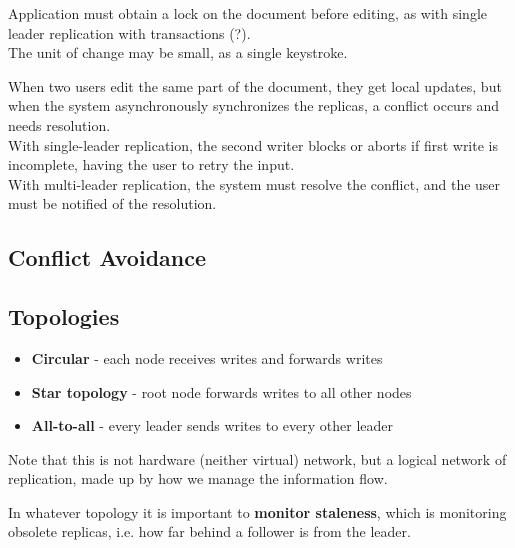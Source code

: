 Application must obtain a lock on the document before editing, as with single leader replication with transactions (?).\\
The unit of change may be small, as a single keystroke.\nl

When two users edit the same part of the document, they get local updates, but when the system asynchronously synchronizes the replicas, a conflict occurs and needs resolution.\\
With single-leader replication, the second writer blocks or aborts if first write is incomplete, having the user to retry the input.\\
With multi-leader replication, the system must resolve the conflict, and the user must be notified of the resolution.

\subsection{Conflict Avoidance}



\subsection{Topologies}
\begin{itemize}
   \item \textbf{Circular} - each node receives writes and forwards writes
   \item \textbf{Star topology} - root node forwards writes to all other nodes 
   \item \textbf{All-to-all} - every leader sends writes to every other leader
\end{itemize}

Note that this is not hardware (neither virtual) network, but a logical network of replication, made up by how we manage the information flow.

In whatever topology it is important to \textbf{monitor staleness}, which is monitoring obsolete replicas, i.e. how far behind a follower is from the leader.

